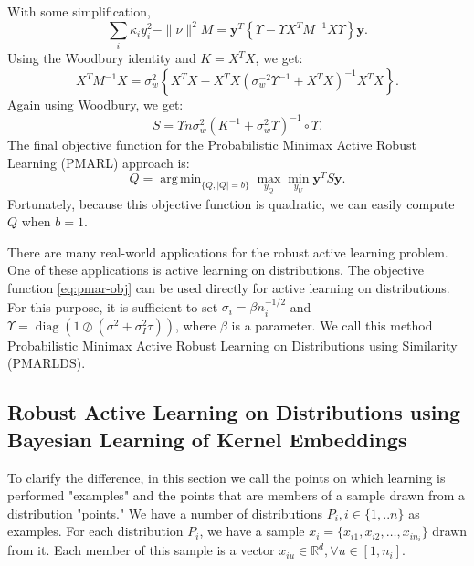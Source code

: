 \documentclass[12pt]{article}
\DeclareMathOperator*{\argmin}{arg\,min}
\DeclareMathOperator{\diag}{diag}
\begin{document}
	With some simplification,
	\begin{equation}
		\sum_i \kappa_i y_i^2 - \|\nu\|^2 M = \mathbf{y}^T \left\{ \Upsilon - \Upsilon X^T M^{-1} X \Upsilon \right\} \mathbf{y}.
	\end{equation}
	Using the Woodbury identity and $K = X^T X$, we get:
	\begin{equation}
		X^T M^{-1} X = \sigma_w^2 \left\{ X^T X - X^T X (\sigma_w^{-2} \Upsilon^{-1} + X^T X)^{-1} X^T X \right\}.
	\end{equation}
	Again using Woodbury, we get:
	\begin{equation}
		S = \Upsilon n \sigma_w^2 (K^{-1} + \sigma_w^2 \Upsilon)^{-1} \circ \Upsilon.
	\end{equation}
	The final objective function for the Probabilistic Minimax Active Robust Learning (PMARL) approach is:
	\begin{equation}
		Q = \argmin_{\{Q, |Q|=b\}} \max_{y_Q} \min_{y_U} \mathbf{y}^T S \mathbf{y}.
	\end{equation}
	Fortunately, because this objective function is quadratic, we can easily compute $Q$ when $b = 1$.
	
	There are many real-world applications for the robust active learning problem. One of these applications is active learning on distributions. The objective function \eqref{eq:pmar-obj} can be used directly for active learning on distributions. For this purpose, it is sufficient to set $\sigma_i = \beta n_i^{-1/2}$ and $\Upsilon = \diag(1 \oslash (\sigma^2 + \sigma_I^2 \tau))$, where $\beta$ is a parameter. We call this method Probabilistic Minimax Active Robust Learning on Distributions using Similarity (PMARLDS).
	
	\subsection{Robust Active Learning on Distributions using Bayesian Learning of Kernel Embeddings}
	\label{subsec:ral-dist-main}
	
	To clarify the difference, in this section we call the points on which learning is performed "examples" and the points that are members of a sample drawn from a distribution "points." We have a number of distributions $P_i, i \in \{1, ..n\}$ as examples. For each distribution $P_i$, we have a sample $x_i = \{x_{i1}, x_{i2}, \ldots, x_{i n_i}\}$ drawn from it. Each member of this sample is a vector $x_{iu} \in \mathbb{R}^d, \forall u \in [1, n_i]$.
	
\end{document}
